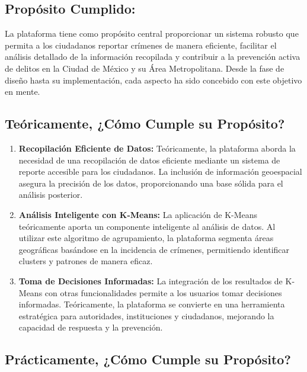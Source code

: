 \documentclass{article}
\begin{document}
    \subsection{Propósito Cumplido:}

    La plataforma tiene como propósito central proporcionar un sistema robusto que permita a los ciudadanos reportar crímenes de manera eficiente, facilitar el análisis detallado de la información recopilada y contribuir a la prevención activa de delitos en la Ciudad de México y su Área Metropolitana. Desde la fase de diseño hasta su implementación, cada aspecto ha sido concebido con este objetivo en mente.

    \subsection{Teóricamente, ¿Cómo Cumple su Propósito?}

        \begin{enumerate}[label=\arabic*.]
            \item \textbf{Recopilación Eficiente de Datos:}
            Teóricamente, la plataforma aborda la necesidad de una recopilación de datos eficiente mediante un sistema de reporte accesible para los ciudadanos. La inclusión de información geoespacial asegura la precisión de los datos, proporcionando una base sólida para el análisis posterior.

            \item \textbf{Análisis Inteligente con K-Means:}
            La aplicación de K-Means teóricamente aporta un componente inteligente al análisis de datos. Al utilizar este algoritmo de agrupamiento, la plataforma segmenta áreas geográficas basándose en la incidencia de crímenes, permitiendo identificar clusters y patrones de manera eficaz.

            \item \textbf{Toma de Decisiones Informadas:}
            La integración de los resultados de K-Means con otras funcionalidades permite a los usuarios tomar decisiones informadas. Teóricamente, la plataforma se convierte en una herramienta estratégica para autoridades, instituciones y ciudadanos, mejorando la capacidad de respuesta y la prevención.
        \end{enumerate}

    \subsection{Prácticamente, ¿Cómo Cumple su Propósito?}
\end{document}
